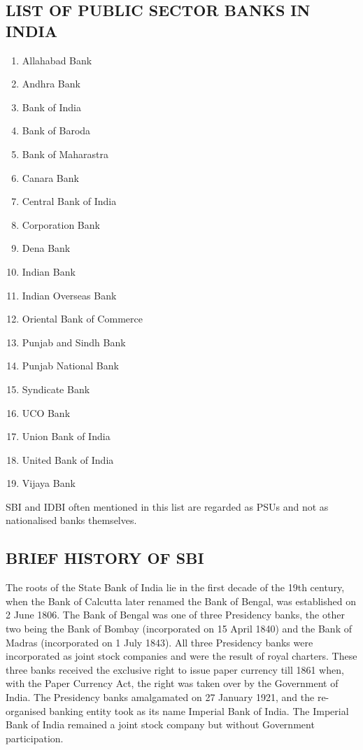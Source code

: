 \documentclass[a4paper, 12pt]{extarticle}
\begin{document}
{\subsection{LIST OF PUBLIC SECTOR BANKS IN INDIA}
\begin{enumerate}
\item Allahabad Bank
\item Andhra Bank
\item Bank of India
\item Bank of Baroda
\item Bank of Maharastra
\item Canara Bank
\item Central Bank of India
\item Corporation Bank
\item Dena Bank
\item Indian Bank
\item Indian Overseas Bank
\item Oriental Bank of Commerce
\item Punjab and Sindh Bank
\item Punjab National Bank
\item Syndicate Bank
\item UCO Bank
\item Union Bank of India
\item United Bank of India
\item Vijaya Bank
\end{enumerate}
\par SBI and IDBI often mentioned in this list are regarded as PSUs and not as nationalised banks themselves.

\subsection{BRIEF HISTORY OF SBI}
\par The roots of the State Bank of India lie in the first decade of the 19th century, when the Bank of Calcutta later renamed the Bank of Bengal, was established on 2 June 1806. The Bank of Bengal was one of three Presidency banks, the other two being the Bank of Bombay (incorporated on 15 April 1840) and the Bank of Madras (incorporated on 1 July 1843). All three Presidency banks were incorporated as joint stock companies and were the result of royal charters. These three banks received the exclusive right to issue paper currency till 1861 when, with the Paper Currency Act, the right was taken over by the Government of India. The Presidency banks amalgamated on 27 January 1921, and the re-organised banking entity took as its name Imperial Bank of India. The Imperial Bank of India remained a joint stock company but without Government participation.

}
\end{document}
